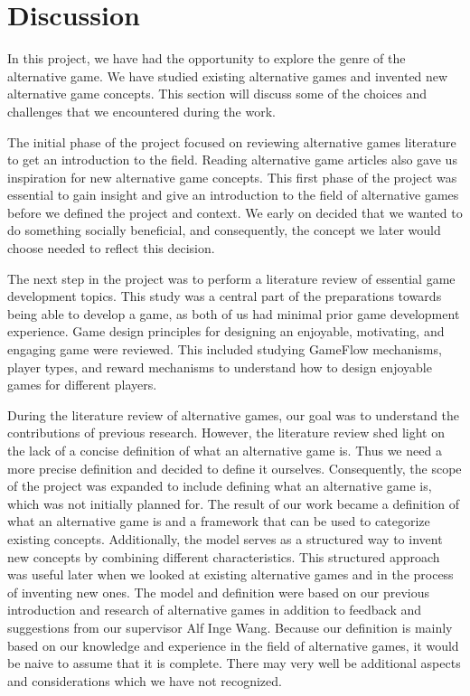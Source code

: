 \documentclass[../Main.tex]{subfiles}
\begin{document}
\section{Discussion}
\label{chap:discussion}

In this project, we have had the opportunity to explore the genre of the alternative game. We have studied existing alternative games and invented new alternative game concepts. This section will discuss some of the choices and challenges that we encountered during the work.

The initial phase of the project focused on reviewing alternative games literature to get an introduction to the field. Reading alternative game articles also gave us inspiration for new alternative game concepts. This first phase of the project was essential to gain insight and give an introduction to the field of alternative games before we defined the project and context. We early on decided that we wanted to do something socially beneficial, and consequently, the concept we later would choose needed to reflect this decision.

The next step in the project was to perform a literature review of essential game development topics. This study was a central part of the preparations towards being able to develop a game, as both of us had minimal prior game development experience. Game design principles for designing an enjoyable, motivating, and engaging game were reviewed. This included studying GameFlow mechanisms, player types, and reward mechanisms to understand how to design enjoyable games for different players. 

During the literature review of alternative games, our goal was to understand the contributions of previous research. However, the literature review shed light on the lack of a concise definition of what an alternative game is. Thus we need a more precise definition and decided to define it ourselves. Consequently, the scope of the project was expanded to include defining what an alternative game is, which was not initially planned for. The result of our work became a definition of what an alternative game is and a framework that can be used to categorize existing concepts. Additionally, the model serves as a structured way to invent new concepts by combining different characteristics. This structured approach was useful later when we looked at existing alternative games and in the process of inventing new ones. The model and definition were based on our previous introduction and research of alternative games in addition to feedback and suggestions from our supervisor Alf Inge Wang. Because our definition is mainly based on our knowledge and experience in the field of alternative games, it would be naive to assume that it is complete. There may very well be additional aspects and considerations which we have not recognized.
\end{document}
